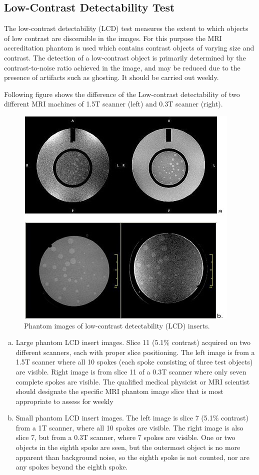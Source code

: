 \documentclass[12pt]{article}
\begin{document}
\subsection{Low-Contrast Detectability Test}
The low-contrast detectability (LCD) test measures the extent to which objects of low contrast are discernible in the images. For this purpose the MRI accreditation phantom is used which contains contrast objects of varying size and contrast. The detection of a low-contrast object is primarily determined by the contrast-to-noise ratio achieved in the image, and may be reduced due to the presence of artifacts such as ghosting. It should be carried out weekly. 

Following figure shows the difference of the Low-contrast detectability of two different MRI machines of 1.5T scanner (left) and 0.3T scanner (right).
\begin{figure}[h!]
    \centering
    \includegraphics[width=0.6\linewidth]{ph4.jpg}
    \caption{\small{Phantom images of low-contrast detectability (LCD) inserts.}}
    \label{fig:Phantom images of low-contrast detectability (LCD) inserts.}
\end{figure}

\begin{enumerate}[a)]
    \item Large phantom LCD insert images. Slice 11 (5.1\% contrast) acquired on two different scanners, each with proper slice positioning. The left image is from a 1.5T scanner where all 10 spokes (each spoke consisting of three test objects) are visible. Right image is from slice 11 of a 0.3T scanner where only seven complete spokes are visible. The qualified medical physicist or MRI scientist should designate the specific  MRI phantom image slice that is most appropriate to assess for weekly
    \item Small phantom LCD insert images. The left image is slice 7 (5.1\% contrast) from a 1T scanner, where all 10 spokes are visible. The right image is also slice 7, but from a 0.3T scanner, where 7 spokes are visible. One or two objects in the eighth spoke are seen, but the outermost object is no more apparent than background noise, so the eighth spoke is not counted, nor are any spokes beyond the eighth spoke.
\end{enumerate}
\end{document}
